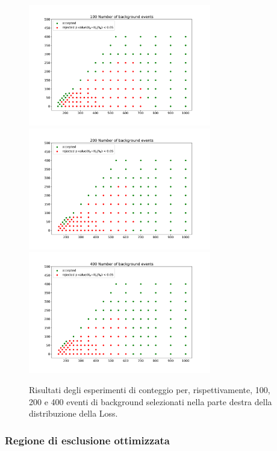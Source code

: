 \begin{figure}[h!]
	\centering
	\includegraphics[width=0.71\textwidth]{figs/risultati_simulazione/100.pdf}
	\includegraphics[width=0.71\textwidth]{figs/risultati_simulazione/200.pdf}
	\includegraphics[width=0.71\textwidth]{figs/risultati_simulazione/400.pdf}
	\caption{Risultati degli esperimenti di conteggio per, rispettivamente, 100, 200 e 400 eventi di background selezionati nella parte destra della distribuzione della Loss.}
	\label{test-100-200-400}
\end{figure}



\subsubsection{Regione di esclusione ottimizzata}
\label{regione di esclusione}


